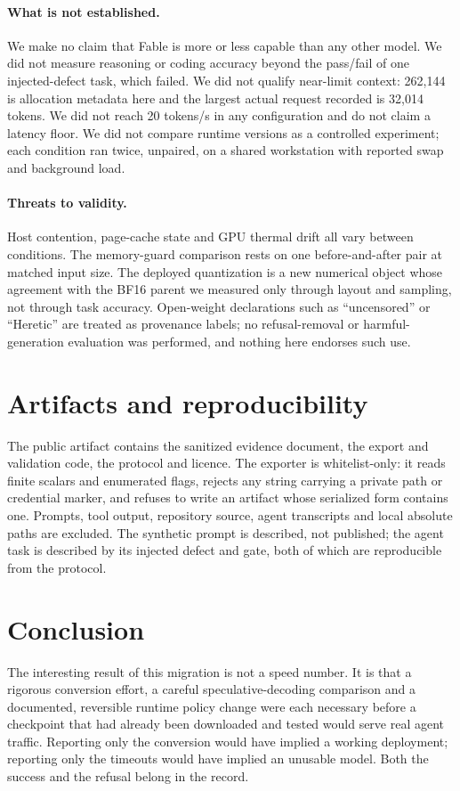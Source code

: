 \documentclass[11pt]{article}
\begin{document}
\paragraph{What is not established.} We make no claim that Fable is more or less capable than any other model. We did not measure reasoning or coding accuracy beyond the pass/fail of one injected-defect task, which failed. We did not qualify near-limit context: 262{,}144 is allocation metadata here and the largest actual request recorded is 32{,}014 tokens. We did not reach 20 tokens/s in any configuration and do not claim a latency floor. We did not compare runtime versions as a controlled experiment; each condition ran twice, unpaired, on a shared workstation with reported swap and background load.

\paragraph{Threats to validity.} Host contention, page-cache state and GPU thermal drift all vary between conditions. The memory-guard comparison rests on one before-and-after pair at matched input size. The deployed quantization is a new numerical object whose agreement with the BF16 parent we measured only through layout and sampling, not through task accuracy. Open-weight declarations such as ``uncensored'' or ``Heretic'' are treated as provenance labels; no refusal-removal or harmful-generation evaluation was performed, and nothing here endorses such use.

\section{Artifacts and reproducibility}
The public artifact contains the sanitized evidence document, the export and validation code, the protocol and licence. The exporter is whitelist-only: it reads finite scalars and enumerated flags, rejects any string carrying a private path or credential marker, and refuses to write an artifact whose serialized form contains one. Prompts, tool output, repository source, agent transcripts and local absolute paths are excluded. The synthetic prompt is described, not published; the agent task is described by its injected defect and gate, both of which are reproducible from the protocol.

\section{Conclusion}
The interesting result of this migration is not a speed number. It is that a rigorous conversion effort, a careful speculative-decoding comparison and a documented, reversible runtime policy change were each necessary before a checkpoint that had already been downloaded and tested would serve real agent traffic. Reporting only the conversion would have implied a working deployment; reporting only the timeouts would have implied an unusable model. Both the success and the refusal belong in the record.
\end{document}
